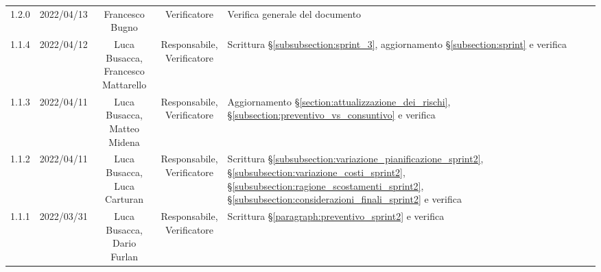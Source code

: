\begin{center}
\begin{longtable}[c]{c | c | c | c | p{5cm}}
		1.2.0                                                      & 2022/04/13 & Francesco Bugno                        & Verificatore   & Verifica generale del documento                                                                                                           \\
		1.1.4                                                      & 2022/04/12 & \Shortunderstack{Luca Busacca,                                                                                                                                                                      \\Francesco Mattarello} & \Shortunderstack{Responsabile,\\Verificatore} & Scrittura §\ref{subsubsection:sprint_3}, aggiornamento §\ref{subsection:sprint} e verifica\\
		1.1.3                                                      & 2022/04/11 & \Shortunderstack{Luca Busacca,                                                                                                                                                                      \\Matteo Midena} & \Shortunderstack{Responsabile,\\Verificatore} & Aggiornamento §\ref{section:attualizzazione_dei_rischi}, §\ref{subsection:preventivo_vs_consuntivo} e verifica\\
		1.1.2                                                      & 2022/04/11 & \Shortunderstack{Luca Busacca,                                                                                                                                                                      \\Luca Carturan} & \Shortunderstack{Responsabile,\\Verificatore} & Scrittura §\ref{subsubsection:variazione_pianificazione_sprint2}, §\ref{subsubsection:variazione_costi_sprint2}, §\ref{subsubsection:ragione_scostamenti_sprint2}, §\ref{subsubsection:considerazioni_finali_sprint2} e verifica\\
		1.1.1                                                      & 2022/03/31 & \Shortunderstack{Luca Busacca,                                                                                                                                                                      \\Dario Furlan} & \Shortunderstack{Responsabile,\\Verificatore} & Scrittura §\ref{paragraph:preventivo_sprint2} e verifica\\

\end{longtable}
\end{center}
